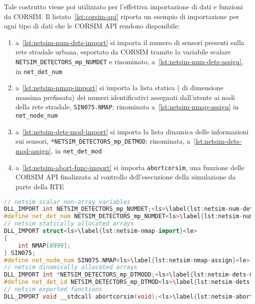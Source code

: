 Tale costrutto viene poi utilizzato per l'effettiva importazione di dati e funzioni da \acs{CORSIM}. Il listato~\ref{lst:corsim-api} riporta un esempio di importazione per ogni tipo di dati che le \acs{CORSIM} \acs{API} rendono disponibile:
\begin{enumerate}
    \item a~\autoref{lst:netsim-num-dets-import} si importa il numero di sensori presenti sulla rete stradale urbana, esportato da \acs{CORSIM} tramite la variabile scalare \lstinline[]|NETSIM_DETECTORS_mp_NUMDET| e rinominato, a~\autoref{lst:netsim-num-dets-assign}, in \lstinline[]|net_det_num|
    \item a~\autoref{lst:netsim-nmap-import} si importa la lista statica (\ie{} di dimensione massima prefissata) dei numeri identificativi assegnati dall'utente ai nodi della rete stradale, \lstinline[]|SIN075.NMAP|; rinominata a~\autoref{lst:netsim-nmap-assign} in \lstinline[]|net_node_num|
    \item a~\autoref{lst:netsim-dets-mod-import} si importa la lista dinamica delle informazioni sui sensori, \lstinline[]|*NETSIM_DETECTORS_mp_DETMOD|; rinominata, a~\autoref{lst:netsim-dets-mod-assign}, in \lstinline[]|net_det_mod|
    \item a~\autoref{lst:netsim-abort-func-import} si importa \lstinline[]|abortcorsim|, una funzione delle \acs{CORSIM} \acs{API} finalizzata al controllo dell'esecuzione della simulazione da parte della \acs{RTE}
\end{enumerate}

\vspace*{8pt}\begin{lstlisting}[language=cpp, caption=Importazione di oggetti delle \acs{CORSIM} \acs{API}, label=lst:corsim-api]
// netsim scalar non-array variables
DLL_IMPORT int NETSIM_DETECTORS_mp_NUMDET;<ls>\label{lst:netsim-num-dets-import}<le>
#define net_det_num NETSIM_DETECTORS_mp_NUMDET<ls>\label{lst:netsim-num-dets-assign}<le>
// netsim statically allocated arrays
DLL_IMPORT struct<ls>\label{lst:netsim-nmap-import}<le>
{
    int NMAP[8999];
} SIN075;
#define net_node_num SIN075.NMAP<ls>\label{lst:netsim-nmap-assign}<le>
// netsim dinamically allocated arrays
DLL_IMPORT int *NETSIM_DETECTORS_mp_DTMODD;<ls>\label{lst:netsim-dets-mod-import}<le>
#define net_det_id NETSIM_DETECTORS_mp_DTMOD<ls>\label{lst:netsim-dets-mod-assign}<le>
// netsim exported functions
DLL_IMPORT void __stdcall abortcorsim(void);<ls>\label{lst:netsim-abort-func-import}<le>
\end{lstlisting}

